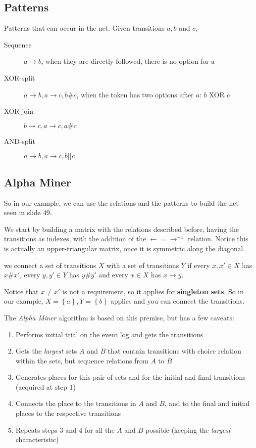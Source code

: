 \subsection*{Patterns}

Patterns that can occur in the net. Given transitions $a, b$ and $c$,
\begin{description}
    \item[Sequence] $a\to b$, when they are directly followed, there is no option for a
    \item[XOR-split] $a\to b, a\to c, b\#c$, when the token has two options after $a$: $b$ XOR $c$ 
    \item[XOR-join] $b\to c, a\to c, a\#c$
    \item[AND-split] $a\to b, a\to c, b||c$
\end{description}

\subsection*{Alpha Miner}

So in our example, we can use the relations and the patterns to build the net seen in slide 49.

We start by building a matrix with the relations described before, having the transitions as
indexes, with the addition of the $\gets = \to^{-1} $ relation. Notice this is actually an
upper-triangular matrix, once it is symmetric along the diagonal.

\begin{remark}
    we connect a set of transitions $X$ with a set of transitions $Y$ if every  $x,x' \in X$ has
    $x\#x'$, every $y,y'\in Y$ has $y\#y'$ and every $x\in X$ has $x\to y$.
\end{remark}

Notice that $x\neq x'$ is not a requirement, so it applies for \textbf{singleton sets}. So in our
example, $X=\left\{ a \right\} , Y=\left\{ b \right\} $ applies and you can connect the transitions.

The \emph{Alpha Miner} algorithm is based on this premise, but has a few caveats:

\begin{enumerate}
    \item Performs initial trial on the event log and gets the transitions
    \item Gets the \emph{largest} sets $A$ and  $B$ that contain transitions with choice relation within
	the sets, but sequence relations from $A$ to $B$
    \item Generates places for this pair of sets and for the initial and final transitions (acquired
	at step 1)
    \item Connects the place to the transitions in  $A$ and $B$, and to the final and initial places
	to the respective transitions
    \item Repeats steps 3 and 4 for all the $A$ and $B$ possible (keeping the \emph{largest}
	characteristic)
\end{enumerate}

